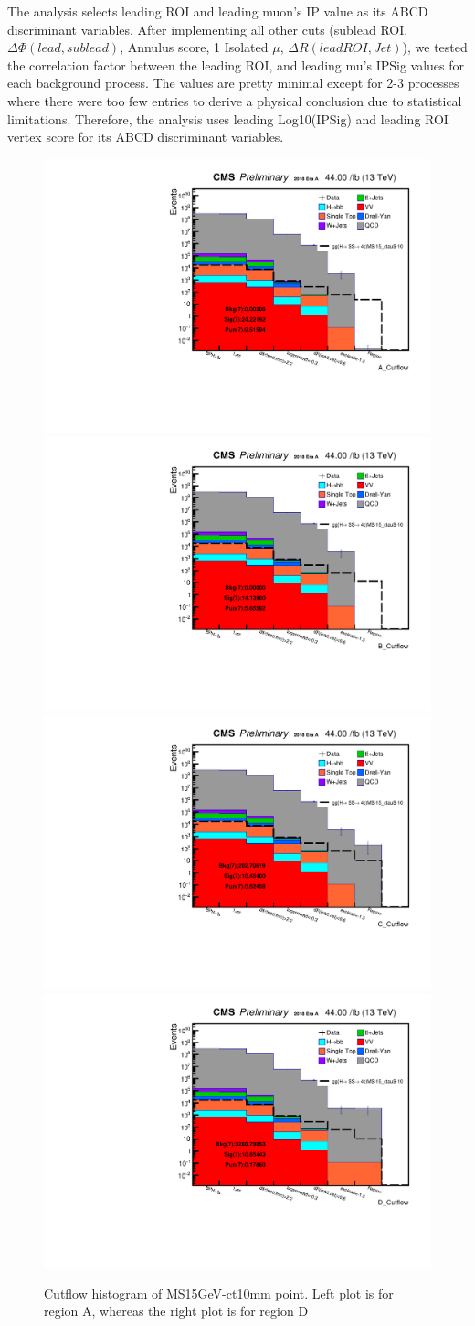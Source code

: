 The analysis selects leading ROI and leading muon's IP value as its ABCD discriminant variables.
After implementing all other cuts (sublead ROI, $\Delta\Phi(lead,sublead)$, Annulus score, 1 Isolated $\mu$, $\Delta R(lead ROI, Jet)$), we tested the correlation factor between the leading ROI, and leading mu's IPSig values for each background process.
The values are pretty minimal except for 2-3 processes where there were too few entries to derive a physical conclusion due to statistical limitations.
Therefore, the analysis uses leading Log10(IPSig) and leading ROI vertex score for its ABCD discriminant variables.
 \begin{figure}[h!]
   \caption{Cutflow histogram of MS15GeV-ct10mm point. Left plot is for region A, whereas the right plot is for region D}
   \label{fig:ABmethod}
   \centering
   \includegraphics[width=0.47\linewidth]{figs/log_CutflAnalysisNote_MS-15_ctauS-10_A_Cutflow.pdf}
   \includegraphics[width=0.47\linewidth]{figs/log_CutflAnalysisNote_MS-15_ctauS-10_B_Cutflow.pdf}
   \includegraphics[width=0.47\linewidth]{figs/log_CutflAnalysisNote_MS-15_ctauS-10_C_Cutflow.pdf}
   \includegraphics[width=0.47\linewidth]{figs/log_CutflAnalysisNote_MS-15_ctauS-10_D_Cutflow.pdf}
 \end{figure}

